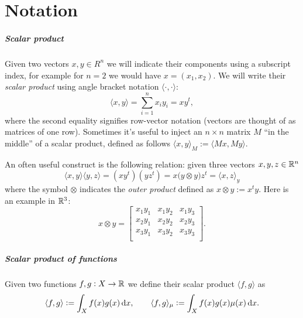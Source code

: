 
\chapter{Notation}

\paragraph{Scalar product}

Given two vectors $x,y \in R^n$ we will indicate their components using a
subscript index,
for example for $n=2$ we would have $x = (x_1, x_2)$.
We will write their \textsl{scalar product} using angle bracket notation
$\langle \cdot, \cdot \rangle$:
\begin{displaymath}
\langle x, y \rangle = \sum_{i=1}^n x_i y_i = xy^t,
\end{displaymath}
where the second equality signifies row-vector notation (vectors are thought
of as matrices of one row). Sometimes it's useful to inject an $n\times n$ matrix $M$ ``in the middle''
of a scalar product, defined as follows $\langle x, y \rangle_M := \langle M x, M y \rangle$.

An often useful construct is the following relation: given
three vectors $x,y,z \in \mathbb{R}^n$
\begin{displaymath}
\langle x,y \rangle \langle y,z \rangle
  = \left(x y^t\right)\left(y z^t\right)
  = x \big(y \otimes y\big) z^t
  = \langle x, z\rangle_y
\end{displaymath}
where the symbol $\otimes$ indicates the \textsl{outer product} defined as $x\otimes y :=
x^t y$. Here is an example in $\mathbb{R}^3$:
\begin{displaymath}
x\otimes y =
\left[
\begin{array}{ccc}
x_1 y_1 & x_1 y_2 & x_1 y_3 \\
x_2 y_1 & x_2 y_2 & x_2 y_3 \\
x_3 y_1 & x_3 y_2 & x_3 y_3 \\
\end{array}
\right].
\end{displaymath}


\paragraph{Scalar product of functions}
Given two functions $f,g:X\to\mathbb{R}$ we define their scalar product
$\langle f, g \rangle$ as
\begin{displaymath}
\langle f, g \rangle := \int_X f(x)g(x) \mathop{}\!\mathrm{d} x, \qquad \langle f, g \rangle_\mu := \int_X f(x)g(x)\mu(x) \mathop{}\!\mathrm{d} x.
\end{displaymath}

